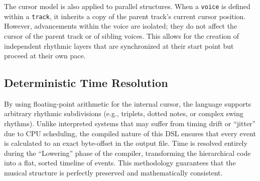 The cursor model is also applied to parallel structures.
When a \texttt{voice} is defined within a \texttt{track}, it inherits a copy of the parent track's current cursor
position.
However, advancements within the voice are isolated; they do not affect the cursor of the parent track or of sibling
voices.
This allows for the creation of independent rhythmic layers that are synchronized at their start point but proceed at
their own pace.

\subsection{Deterministic Time Resolution}\label{subsec:deterministic-time-resolution}

By using floating-point arithmetic for the internal cursor, the language supports arbitrary rhythmic subdivisions
(e.g., triplets, dotted notes, or complex swing rhythms).
Unlike interpreted systems that may suffer from timing drift or ``jitter'' due to CPU scheduling, the compiled nature of
this DSL ensures that every event is calculated to an exact byte-offset in the output file.
Time is resolved entirely during the ``Lowering'' phase of the compiler, transforming the hierarchical code into a flat,
sorted timeline of events.
This methodology guarantees that the musical structure is perfectly preserved and mathematically consistent.
